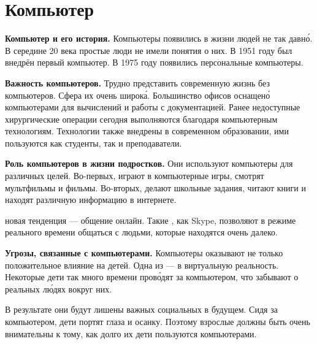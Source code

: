 

\section{Компьютер}
\textbf{Компьютер и его история.} Компьютеры появились в жизни людей не так давн\'{о}. В середине 20 века простые люди не имели понятия о них. В 1951 году был внедрён первый  компьютер. В 1975 году появились персональные компьютеры.

\textbf{Важность компьютеров.} Трудно представить современную жизнь без компьютеров. Сфера их  очень широк\'{а}.
Большинство офисов оснащен\'{о} компьютерами для вычислений и работы с документацией. Ранее недоступные хирургические операции сегодня выполняются благодаря компьютерным технологиям. Технологии также внедрены в современном образовании, ими пользуются как студенты, так и преподаватели.

\textbf{Роль компьютеров в жизни подростков.}
Они используют компьютеры для различных целей. Во-первых, играют в компьютерные игры, смотрят мультфильмы и фильмы. Во-вторых, делают школьные задания, читают книги и находят различную информацию в интернете.

 новая тенденция --- общение онлайн. Такие , как Skype, позволяют в режиме реального времени общаться с людьми, которые находятся очень далеко.

\textbf{Угрозы, связанные с компьютерами.}
Компьютеры оказывают не только положительное влияние на детей. Одна из  ---  в виртуальную реальность. Некоторые дети так много времени пров\'{о}дят за компьютером, что забывают о реальных л\'{ю}дях вокруг них.

В результате они будут лишены важных социальных  в будущем. Сидя за компьютером, дети портят глаза и осанку. Поэтому взрослые должны быть очень внимательны к тому, как долго их дети пользуются компьютерами.



\clearpage
